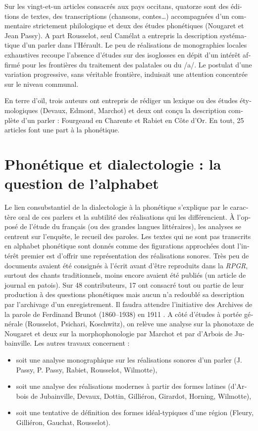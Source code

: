 \documentclass[output=paper]{../langscibook}
\begin{document}
\begin{otherlanguage}{french}
Sur les vingt-et-un articles consacrés aux pays occitans, quatorze sont des éditions de textes, des transcriptions (chansons, contes…) accompagnées d’un commentaire strictement philologique et deux des études phonétiques (Nougaret et Jean Passy). A part Rousselot, seul Camélat a entrepris la description systématique d’un parler dans l’Hérault. Le peu de réalisations de monographies locales exhaustives recoupe l’absence d’études sur des isoglosses en dépit d’un intérêt affirmé pour les frontières du traitement des palatales ou du /a/. Le postulat d’une variation progressive, sans véritable frontière, induisait une attention concentrée sur le niveau communal. 

En terre d’oïl, trois auteurs ont entrepris de rédiger un lexique ou des études étymologiques (Devaux, Edmont, Marchot) et deux ont conçu la description complète d’un parler : Fourgeaud en Charente et Rabiet en Côte d’Or. En tout, 25 articles font une part à la phonétique.

\section{Phonétique et dialectologie : la question de l’alphabet}

Le lien consubstantiel de la dialectologie à la phonétique s’explique par le caractère oral de ces parlers et la subtilité des réalisations qui les différencient. À l’opposé de l’étude du français (ou des grandes langues littéraires), les analyses se centrent sur l’enquête, le recueil des paroles. Les textes qui ne sont pas transcrits en alphabet phonétique sont donnés comme des figurations approchées dont l’intérêt premier est d’offrir une représentation des réalisations sonores. Très peu de documents avaient été consignés à l’écrit avant d’être reproduits dans la \textit{RPGR}, surtout des chants traditionnels, moins encore avaient été publiés (un article de journal en patois). Sur 48 contributeurs, 17 ont consacré tout ou partie de leur production à des questions phonétiques mais aucun n’a redoublé sa description par l’archivage d’un enregistrement. Il faudra attendre l’initiative des Archives de la parole de Ferdinand Brunot (1860--1938) en 1911 \citep{cordereix_ferdinand_2001}. A côté d’études à portée générale (Rousselot, Psichari, Koschwitz), on relève une analyse sur la phonotaxe de Nougaret et deux sur la morphophonologie par Marchot et par d’Arbois de Jubainville. Les autres travaux concernent :

\begin{itemize}
    \item  soit une analyse monographique sur les réalisations sonores d’un parler (J. Passy, P. Passy, Rabiet, Rousselot, Wilmotte), 
    \item  soit une analyse des réalisations modernes à partir des formes latines (d’Arbois de Jubainville, Devaux, Dottin, Gilliéron, Girardot, Horning, Wilmotte), 
    \item  soit une tentative de définition des formes idéal-typiques d’une région (Fleury, Gilliéron, Gauchat, Rousselot).
\end{itemize}


\end{otherlanguage}
\end{document}
